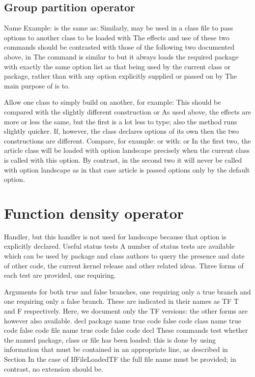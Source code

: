 \documentclass{article}
\begin{document}
\subsection{Group partition operator}
Name Example: is the same as: Similarly, may be used in a class file to pass options to another class to be loaded with The effects and use of these two commands should be contrasted with those of the following two documented above, in The command is similar to but it always loads the required package with exactly the same option list as that being used by the current class or package, rather than with any option explicitly supplied or passed on by The main purpose of is to.

Allow one class to simply build on another, for example: This should be compared with the slightly different construction or As used above, the effects are more or less the same, but the first is a lot less to type; also the method runs slightly quicker. If, however, the class declares options of its own then the two constructions are different. Compare, for example: or with: or In the first two, the article class will be loaded with option landscape precisely when the current class is called with this option. By contrast, in the second two it will never be called with option landscape as in that case article is passed options only by the default option.

\section{Function density operator}\label{sec5}
Handler, but this handler is not used for landscape because that option is explicitly declared. Useful status tests A number of status tests are available which can be used by package and class authors to query the presence and date of other code, the current kernel release and other related ideas. Three forms of each test are provided, one requiring.

Arguments for both true and false branches, one requiring only a true branch and one requiring only a false branch. These are indicated in their names as TF T and F respectively. Here, we document only the TF versions: the other forms are however also available. decl package name true code false code class name true code false code file name true code false code decl These commands test whether the named package, class or file has been loaded: this is done by using information that must be contained in an appropriate line, as described in Section In the case of IfFileLoadedTF the full file name must be provided; in contrast, no extension should be.
\end{document}
